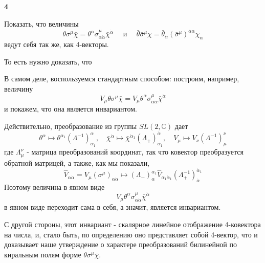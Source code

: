 \documentclass[a4paper,12pt]{article} %
\begin{document}
\begin{task}\textbf{4}

Показать, что величины
$$
\theta \sigma^{\mu} \bar{\chi}=
\theta^{\alpha} \sigma_{\alpha \dot{\alpha}}^{\mu} \bar{\chi}^{\dot{\alpha}} 
\quad \text { и } \quad 
\bar{\theta} \bar{\sigma}^{\mu} \chi=
\bar{\theta}_{\dot{\alpha}}\left(\bar{\sigma}^{\mu}\right)^{\dot{\alpha} \alpha} \chi_{\alpha}
$$
ведут себя так же, как 4-векторы.

То есть нужно доказать, что



В самом деле, воспользуемся стандартным способом: 
построим, например, величину
$$
V_{\mu} \theta \sigma^{\mu} \bar{\chi}
=
V_{\mu} \theta^{\alpha} \sigma_{\alpha \dot{\alpha}}^{\mu} \bar{\chi}^{\dot{\alpha}}
$$
и покажем, что она является инвариантом. 


Действительно, преобразование из группы $S L(2, \mathbb{C})$ дает
$$
\theta^{\alpha} \mapsto \theta^{\alpha_{1}}\left(\Lambda^{-1}\right)_{\alpha_{1}}^{\alpha}, \quad \bar{\chi}^{\dot{\alpha}} \mapsto \bar{\chi}^{\dot{\alpha}_{1}}\left(\Lambda_{+}\right)_{\dot{\alpha}_{1}}^{\dot{\alpha}}, \quad V_{\mu} \mapsto V_{\nu}\left(\Lambda^{-1}\right)_{\mu}^{\nu}
$$
где $\Lambda_{\mu}^{\nu}$ - матрица преобразований координат, так что ковектор преобразуется обратной матрицей, а также, как мы показали,
$$
\hat{V}_{\alpha \dot{\alpha}}=V_{\mu}\left(\sigma^{\mu}\right)_{\alpha \dot{\alpha}} \mapsto\left(\Lambda_{-}\right)_{\alpha}^{\alpha_{1}} \hat{V}_{\alpha_{1} \dot{\alpha}_{1}}\left(\Lambda_{+}^{-1}\right)_{\dot{\alpha}}^{\dot{\alpha}_{1}}
$$
Поэтому величина в явном виде
$$
V_{\mu} \theta^{\alpha} \sigma_{\alpha \dot{\alpha}}^{\mu} \bar{\chi}^{\dot{\alpha}}
$$
в явном виде переходит сама в себя, а значит, является инвариантом. 




С другой стороны, этот инвариант - скалярное линейное отображение 4-ковектора на числа, и, 
стало быть, по определению оно представляет собой 4-вектор, 
что и доказывает наше утверждение о характере преобразований 
билинейной по киральным полям форме $\theta \sigma^{\mu} \bar{\chi}$. 








\end{task}
\end{document}
